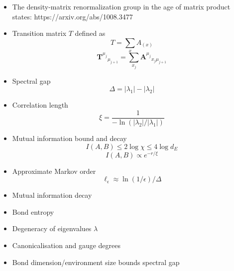 \begin{itemize}
    \item The density-matrix renormalization group in the age of matrix product states: https://arxiv.org/abs/1008.3477
    \item Transition matrix \(T\) defined as
    \[
    T = \sum_x A_{(x)}
    \]
    \[\mathbf{T}^{\mu_j}{}_{\mu_{j+1}} = \sum_{x_j} \mathbf{A}^{\mu_j}{}_{x_j \mu_{j+1}}\]
    \item Spectral gap
    \[
    \Delta = |\lambda_1| - |\lambda_2|
    \]
    \item Correlation length
    \[
    \xi = \frac{1}{-\ln{(|\lambda_2|/|\lambda_1|)}}
    \]
    \item Mutual information bound and decay
    \[
    I(A,B) \leq 2\log \chi \leq 4\log d_E
    \]
    \[
    I(A,B) \propto e^{-r/\xi}
    \]
    \item Approximate Markov order
    \[\ell_\epsilon \approx  \ln (1/\epsilon)/\Delta\]
    \item Mutual information decay
    \item Bond entropy
    \item Degeneracy of eigenvalues \(\lambda\)
    \item Canonicalisation and gauge degrees
    \item Bond dimension/environment size bounds spectral gap
\end{itemize}
